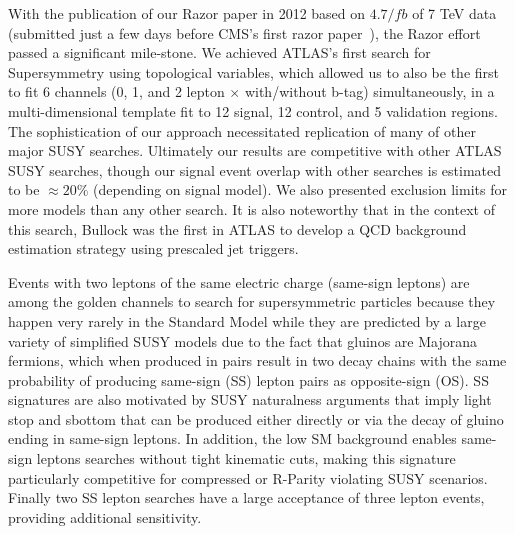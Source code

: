With the publication of our Razor paper in 2012 based on $4.7/fb$ of 7
TeV data~\cite{ATLASRazorPaper} (submitted just a few days before CMS's first
razor paper~\cite{CMSRazorPaper}), the Razor effort passed a
significant mile-stone. We achieved ATLAS's first search for
Supersymmetry using topological variables, which allowed us to also be
the first to fit 6 channels (0, 1, and 2 lepton $\times$ with/without
b-tag) simultaneously, in a multi-dimensional template fit to 12
signal, 12 control, and 5 validation regions. The sophistication of
our approach necessitated replication of many of other major SUSY
searches. Ultimately our results are competitive with other ATLAS SUSY
searches, though our signal event overlap with other searches is
estimated to be $\approx20\%$ (depending on signal model). We also
presented exclusion limits for more models than any other search. It
is also noteworthy that in the context of this search, Bullock was the
first in ATLAS to develop a QCD background estimation strategy using
prescaled jet triggers.

 Events with two leptons of
the same electric charge (same-sign leptons) are among the golden
channels to search for supersymmetric particles because they happen
very rarely in the Standard Model while they are predicted by a large
variety of simplified SUSY models due to the fact that gluinos are
Majorana fermions, which when produced in pairs result in two decay
chains with the same probability of producing same-sign (SS) lepton
pairs as opposite-sign (OS). SS signatures are also motivated by SUSY
naturalness arguments that imply light stop and sbottom that can be
produced either directly or via the decay of gluino ending in
same-sign leptons. In addition, the low SM background enables
same-sign leptons searches without tight kinematic cuts, making this
signature particularly competitive for compressed or R-Parity
violating SUSY scenarios. Finally two SS lepton searches have a large
acceptance of three lepton events, providing additional sensitivity.


